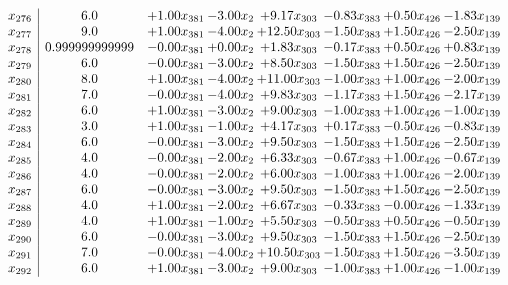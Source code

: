 \documentclass[8pt]{article}
\begin{document}
\[\begin{array}{c| c c@{\hskip 2pt} c@{\hskip 2pt} c@{\hskip 2pt} c@{\hskip 2pt} c@{\hskip 2pt} c@{\hskip 2pt} }
 x_{276}   &  6.0 & +  1.00 x_{381} & -3.00 x_{2} & +  9.17 x_{303} & -0.83 x_{383} & +  0.50 x_{426} & -1.83 x_{139}\\
 x_{277}   &  9.0 & +  1.00 x_{381} & -4.00 x_{2} & + 12.50 x_{303} & -1.50 x_{383} & +  1.50 x_{426} & -2.50 x_{139}\\
 x_{278}   &  0.999999999999 & -0.00 x_{381} & +  0.00 x_{2} & +  1.83 x_{303} & -0.17 x_{383} & +  0.50 x_{426} & +  0.83 x_{139}\\
 x_{279}   &  6.0 & -0.00 x_{381} & -3.00 x_{2} & +  8.50 x_{303} & -1.50 x_{383} & +  1.50 x_{426} & -2.50 x_{139}\\
 x_{280}   &  8.0 & +  1.00 x_{381} & -4.00 x_{2} & + 11.00 x_{303} & -1.00 x_{383} & +  1.00 x_{426} & -2.00 x_{139}\\
 x_{281}   &  7.0 & -0.00 x_{381} & -4.00 x_{2} & +  9.83 x_{303} & -1.17 x_{383} & +  1.50 x_{426} & -2.17 x_{139}\\
 x_{282}   &  6.0 & +  1.00 x_{381} & -3.00 x_{2} & +  9.00 x_{303} & -1.00 x_{383} & +  1.00 x_{426} & -1.00 x_{139}\\
 x_{283}   &  3.0 & +  1.00 x_{381} & -1.00 x_{2} & +  4.17 x_{303} & +  0.17 x_{383} & -0.50 x_{426} & -0.83 x_{139}\\
 x_{284}   &  6.0 & -0.00 x_{381} & -3.00 x_{2} & +  9.50 x_{303} & -1.50 x_{383} & +  1.50 x_{426} & -2.50 x_{139}\\
 x_{285}   &  4.0 & -0.00 x_{381} & -2.00 x_{2} & +  6.33 x_{303} & -0.67 x_{383} & +  1.00 x_{426} & -0.67 x_{139}\\
 x_{286}   &  4.0 & -0.00 x_{381} & -2.00 x_{2} & +  6.00 x_{303} & -1.00 x_{383} & +  1.00 x_{426} & -2.00 x_{139}\\
 x_{287}   &  6.0 & -0.00 x_{381} & -3.00 x_{2} & +  9.50 x_{303} & -1.50 x_{383} & +  1.50 x_{426} & -2.50 x_{139}\\
 x_{288}   &  4.0 & +  1.00 x_{381} & -2.00 x_{2} & +  6.67 x_{303} & -0.33 x_{383} & -0.00 x_{426} & -1.33 x_{139}\\
 x_{289}   &  4.0 & +  1.00 x_{381} & -1.00 x_{2} & +  5.50 x_{303} & -0.50 x_{383} & +  0.50 x_{426} & -0.50 x_{139}\\
 x_{290}   &  6.0 & -0.00 x_{381} & -3.00 x_{2} & +  9.50 x_{303} & -1.50 x_{383} & +  1.50 x_{426} & -2.50 x_{139}\\
 x_{291}   &  7.0 & -0.00 x_{381} & -4.00 x_{2} & + 10.50 x_{303} & -1.50 x_{383} & +  1.50 x_{426} & -3.50 x_{139}\\
 x_{292}   &  6.0 & +  1.00 x_{381} & -3.00 x_{2} & +  9.00 x_{303} & -1.00 x_{383} & +  1.00 x_{426} & -1.00 x_{139}\\

\end{array}\]
\end{document}
